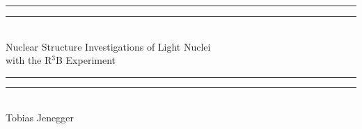 \documentclass[12pt,twoside]{article}
\begin{document}
{%
  \centering %
  \vspace*{\baselineskip} %
  
  \rule{\textwidth}{1.6pt}\vspace*{-\baselineskip}\vspace*{2pt} 
  \rule{\textwidth}{0.4pt}\\[\baselineskip]
  

	{\Large Nuclear Structure Investigations of Light Nuclei \\[0.3\baselineskip] with the R$^3$B Experiment   \\[0.3\baselineskip]
	}

  \rule{\textwidth}{0.4pt}\vspace*{-\baselineskip}\vspace{3.2pt}
  \rule{\textwidth}{2pt}\\[\baselineskip] %
  
  
  {\Huge Tobias Jenegger }
  
  \vspace*{2\baselineskip} %
  
  
  \vspace*{\fill}
  
  
  
}
\end{document}
